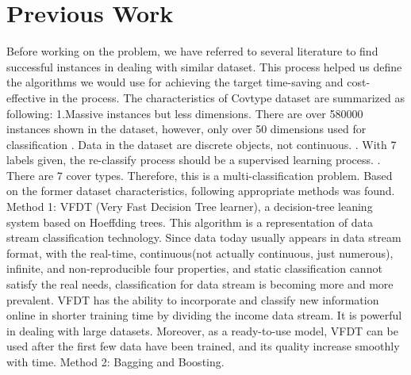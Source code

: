 \documentclass[12pt]{report}
\begin{document}
\section*{Previous Work}
Before working on the problem, we have referred to several literature to find successful instances in dealing with similar dataset. This process helped us define the algorithms we would use for achieving the target time-saving and cost-effective in the process.
\newline
\newline
The characteristics of Covtype dataset are summarized as following:
\newline 1.Massive instances but less dimensions.
\newline
There are over 580000 instances shown in the dataset, however, only over 50 dimensions used for classification
. Data in the dataset are discrete objects, not continuous.
. With 7 labels given, the re-classify process should be a supervised learning process.
. There are 7 cover types. Therefore, this is a multi-classification problem.
\newline
\newline
Based on the former dataset characteristics, following appropriate methods was found.
\newline
\newline
Method 1: VFDT (Very Fast Decision Tree learner), a decision-tree leaning system based on Hoeffding trees. 
\newline This algorithm is a representation of data stream classification technology. Since data today usually appears in data stream format, with the real-time, continuous(not actually continuous, just numerous), infinite, and non-reproducible four properties, and static classification cannot satisfy the real needs, classification for data stream is becoming more and more prevalent. 
\newline VFDT has the ability to incorporate and classify new information online in shorter training time by dividing the income data stream. It is powerful in dealing with large datasets. Moreover, as a ready-to-use model, VFDT can be used after the first few data have been trained, and its quality increase smoothly with time.
\newline
\newline
Method 2: Bagging and Boosting.
\end{document}
